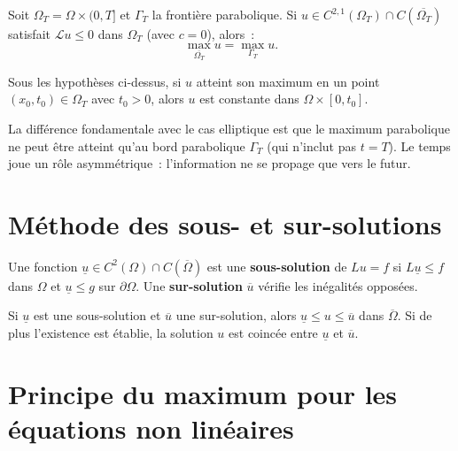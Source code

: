 \begin{theoreme}
Soit $\Omega_T = \Omega \times (0,T]$ et $\Gamma_T$ la fronti\`ere
parabolique. Si $u \in C^{2,1}(\Omega_T) \cap C(\overline{\Omega_T})$
satisfait $\mathcal{L}u \leq 0$ dans $\Omega_T$ (avec $c = 0$), alors~:
\begin{equation}\label{eq:max_parabolique}
    \max_{\overline{\Omega_T}} u = \max_{\Gamma_T} u.
\end{equation}
\end{theoreme}

\begin{theoreme}
Sous les hypoth\`eses ci-dessus, si $u$ atteint son maximum en un point
$(x_0, t_0) \in \Omega_T$ avec $t_0 > 0$, alors $u$ est constante dans
$\Omega \times [0, t_0]$.
\end{theoreme}

\begin{remarque}
La diff\'erence fondamentale avec le cas elliptique est que le maximum
parabolique ne peut \^etre atteint qu'au bord parabolique $\Gamma_T$
(qui n'inclut pas $t = T$). Le temps joue un r\^ole asymm\'etrique~:
l'information ne se propage que vers le futur.
\end{remarque}

\section{M\'ethode des sous- et sur-solutions}

\begin{definition}
Une fonction $\underline{u} \in C^2(\Omega) \cap C(\overline{\Omega})$
est une \textbf{sous-solution} de $Lu = f$ si $L\underline{u} \leq f$
dans $\Omega$ et $\underline{u} \leq g$ sur $\partial\Omega$.
Une \textbf{sur-solution} $\overline{u}$ v\'erifie les in\'egalit\'es
oppos\'ees.
\end{definition}

\begin{theoreme}
Si $\underline{u}$ est une sous-solution et $\overline{u}$ une sur-solution,
alors $\underline{u} \leq u \leq \overline{u}$ dans $\overline{\Omega}$.
Si de plus l'existence est \'etablie, la solution $u$ est coinc\'ee entre
$\underline{u}$ et $\overline{u}$.
\end{theoreme}

\section{Principe du maximum pour les \'equations non lin\'eaires}

